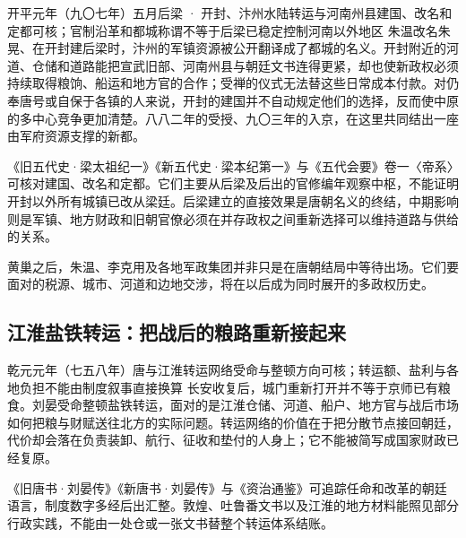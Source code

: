 \begin{event}{}{开平元年（九〇七年）五月}{后梁 · 开封、汴州水陆转运与河南州县}{建国、改名和定都可核；官制沿革和都城称谓不等于后梁已稳定控制河南以外地区}
朱温改名朱晃、在开封建后梁时，汴州的军镇资源被公开翻译成了都城的名义。开封附近的河道、仓储和道路能把宣武旧部、河南州县与朝廷文书连得更紧，却也使新政权必须持续取得粮饷、船运和地方官的合作；受禅的仪式无法替这些日常成本付款。对仍奉唐号或自保于各镇的人来说，开封的建国并不自动规定他们的选择，反而使中原的多中心竞争更加清楚。八八二年的受授、九〇三年的入京，在这里共同结出一座由军府资源支撑的新都。

《旧五代史·梁太祖纪一》《新五代史·梁本纪第一》与《五代会要》卷一〈帝系〉可核对建国、改名和定都。它们主要从后梁及后出的官修编年观察中枢，不能证明开封以外所有城镇已改从梁廷。后梁建立的直接效果是唐朝名义的终结，中期影响则是军镇、地方财政和旧朝官僚必须在并存政权之间重新选择可以维持道路与供给的关系。
\end{event}

黄巢之后，朱温、李克用及各地军政集团并非只是在唐朝结局中等待出场。它们要面对的税源、城市、河道和边地交涉，将在以后成为同时展开的多政权历史。

\subsection{江淮盐铁转运：把战后的粮路重新接起来}
\begin{event}{}{乾元元年（七五八年）}{唐与江淮转运网络}{受命与整顿方向可核；转运额、盐利与各地负担不能由制度叙事直接换算}
长安收复后，城门重新打开并不等于京师已有粮食。刘晏受命整顿盐铁转运，面对的是江淮仓储、河道、船户、地方官与战后市场如何把粮与财赋送往北方的实际问题。转运网络的价值在于把分散节点接回朝廷，代价却会落在负责装卸、航行、征收和垫付的人身上；它不能被简写成国家财政已经复原。

《旧唐书·刘晏传》《新唐书·刘晏传》与《资治通鉴》可追踪任命和改革的朝廷语言，制度数字多经后出汇整。敦煌、吐鲁番文书以及江淮的地方材料能照见部分行政实践，不能由一处仓或一张文书替整个转运体系结账。
\end{event}
